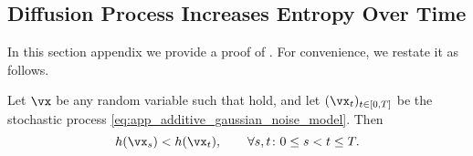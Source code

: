 \documentclass[../../book-main.tex]{subfiles}
\begin{document}
\subsection{Diffusion Process Increases Entropy Over Time}\label{sub:diffusion_entropy_increases}

In this section appendix we provide a proof of . For convenience, we restate it as follows. 

\begin{theorem}\label{thm:diffusion_entropy_increases}
    Let \(\vx\) be any random variable such that  hold, and let \((\vx_{t})_{t \in [0, T]}\) be the stochastic process \eqref{eq:app_additive_gaussian_noise_model}. Then 
    \begin{equation}\label{eq:diffusion_entropy_increases}
        h(\vx_{s}) < h(\vx_{t}), \qquad \forall s, t \colon 0 \leq s < t \leq T.
    \end{equation}
\end{theorem}
\end{document}
